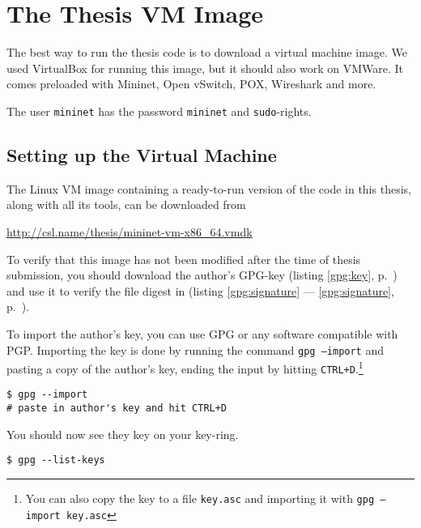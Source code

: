 \chapter{The Thesis VM Image}
\label{chapter:install.vm}

The best way to run the thesis code is to download a virtual machine image.
We used VirtualBox for running this image, but it should
also work on VMWare.  It comes preloaded with
Mininet, Open vSwitch,
  POX,
  Wireshark and more.

The user \texttt{mininet} has the password \texttt{mininet} and
\texttt{sudo}-rights.

\section{Setting up the Virtual Machine}

The Linux VM image containing a ready-to-run version of the
code in this thesis, along with all its tools, can be downloaded from

\begin{center}
  \url{http://csl.name/thesis/mininet-vm-x86_64.vmdk}
  \label{gpg:url}
\end{center}

To verify that this image has not been modified after the time of thesis
submission, you should download the author's GPG-key  (listing
\ref{gpg:key}, p.~\pageref{gpg:key}) and use it to verify the file digest
in (listing \vref{gpg:signature} --- \ref{gpg:signature}, p.~\pageref{gpg:signature}).

To import the author's key, you can use \ac{GPG} or any software compatible
with \ac{PGP}.  Importing the key is done by running the command
\texttt{gpg --import} and pasting a copy of the author's key, ending the
input by hitting \texttt{CTRL+D}.\footnote{You can also copy the key to a
  file \texttt{key.asc} and importing it with \texttt{gpg --import key.asc}}

\begin{lstlisting}
$ gpg --import
# paste in author's key and hit CTRL+D
\end{lstlisting}

You should now see they key on your key-ring.

\begin{lstlisting}
$ gpg --list-keys
\end{lstlisting}

